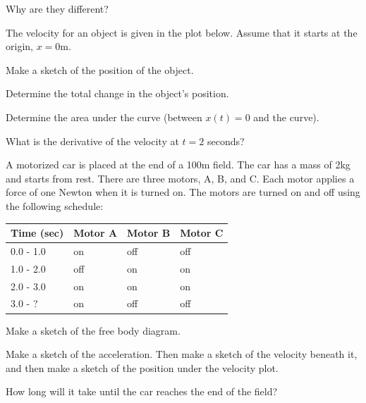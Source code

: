 \begin{problem}
  \item Why are they different?

    \vfill

  \clearpage

\item The velocity for an object is given in the plot below. Assume
  that it starts at the origin, $x=0$m.

  \scalebox{0.7}{}

  \begin{subproblem}
    \item Make a sketch of the position of the object.
    \item Determine the total change in the object's position.
      \vfill
    \item Determine the area under the curve (between $x(t)=0$ and the
      curve).
      \vfill
    \item What is the derivative of the velocity at $t=2$ seconds?
      \vspace{1em}
  \end{subproblem}

  \clearpage

\item A motorized car is placed at the end of a 100m field. The car
  has a mass of 2kg and starts from rest. There are three motors, A,
  B, and C. Each motor applies a force of one Newton when it is turned
  on. The motors are
  turned on and off using the following schedule: \\
  \begin{tabular}{l|lll}
    Time (sec) & Motor A & Motor B & Motor C \\ \hline
    0.0 - 1.0  & on      & off     & off     \\ 
    1.0 - 2.0  & off     & on      & on      \\ 
    2.0 - 3.0  & on      & on      & on      \\ 
    3.0 - ?    & on      & off     & off     
  \end{tabular}
  \label{newtonsLawMotorizedCar}

  \begin{subproblem}
  \item Make a sketch of the free body diagram.
    \vspace{8em}
  \item Make a sketch of the acceleration. Then make a sketch of the
    velocity beneath it, and then make a sketch of the position under
    the velocity plot.
    \vfill
    \clearpage
  \item How long will it take until the car reaches the end of the
    field?
    \vfill
  \end{subproblem}

\end{problem}

